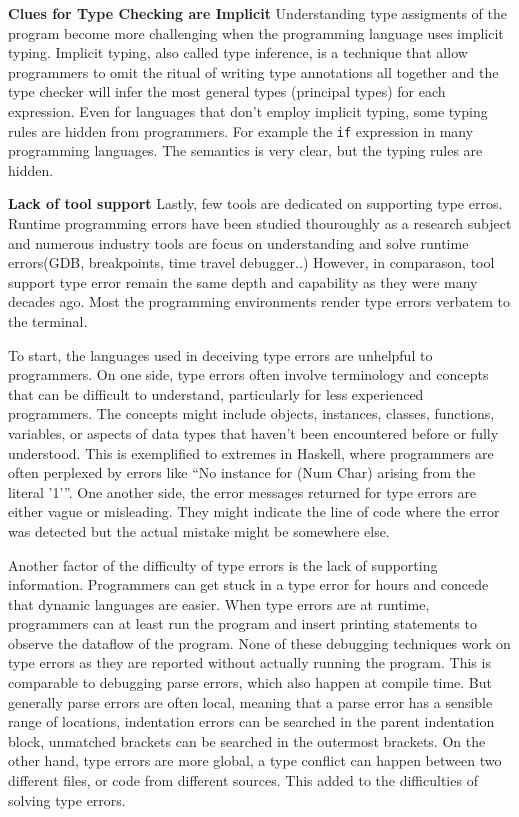 \textbf{Clues for Type Checking are Implicit}
Understanding type assigments of the program become more challenging when the programming language uses implicit typing. Implicit typing, also called type inference, is a technique that allow programmers to omit the ritual of writing type annotations all together and the type checker will infer the most general types (principal types) for each expression. Even for languages that don't employ implicit typing, some typing rules are hidden from programmers.
For example the \texttt{if} expression in many programming languages. The semantics is very clear, but the typing rules are hidden.

\textbf{Lack of tool support}
Lastly, few tools are dedicated on supporting type erros. Runtime programming errors have been studied thouroughly as a research subject and numerous industry tools are focus on understanding and solve runtime errors(GDB, breakpoints, time travel debugger..)  However, in comparason, tool support type error  remain the same depth and capability as they were many decades ago. Most the programming environments render type errors verbatem to the terminal.   


To start, the languages used in deceiving type errors are unhelpful to programmers. On one side, type errors often involve terminology and concepts that can be difficult to understand, particularly for less experienced programmers. The concepts might include objects, instances, classes, functions, variables, or aspects of data types that haven't been encountered before or fully understood. This is exemplified to extremes in Haskell, where programmers are often perplexed by errors like “No instance for (Num Char) arising from the literal '1'”. One another side,  the error messages returned for type errors are either vague or misleading. They might indicate the line of code where the error was detected but the actual mistake might be somewhere else.




Another factor of the difficulty of type errors is the lack of supporting information. Programmers can get stuck in a type error for hours and concede that dynamic languages are easier. When type errors are at runtime, programmers can at least run the program and insert printing statements to observe the dataflow of the program. None of these debugging techniques work on type errors as they are reported without actually running the program.  This is  comparable to debugging parse errors, which also happen at compile time. But generally parse errors are often local, meaning that a parse error has a sensible range of locations,  indentation errors can be searched in the parent indentation block, unmatched brackets can be searched in the outermost brackets. On the other hand, type errors are more global, a type conflict can happen between two different files, or code from different sources. This added to the difficulties of solving type errors.
 

